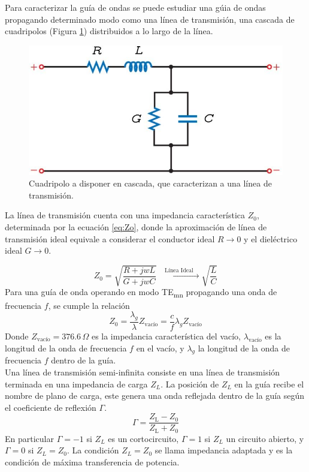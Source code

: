 \documentclass[11pt,a4paper]{article}
\begin{document}
\begin{multicols}{2}
Para caracterizar la guía de ondas se puede estudiar una gúia de ondas propagando determinado modo como una línea de transmisión, una cascada de cuadripolos (Figura \ref{fig:cuadri}) distribuidos a lo largo de la línea.
\begin{figure}[H]
\centering
\includegraphics[width=0.8\linewidth]{Images/linea de transm.jpeg}
\caption{Cuadripolo a disponer en cascada, que caracterizan a una línea de transmisión.}\label{fig:cuadri}
\end{figure}
La línea de transmisión cuenta con una impedancia característica $Z_0$, determinada por la ecuación \ref{eq:Zo}, donde la aproximación de línea de transmisión ideal equivale a considerar el conductor ideal $R\rightarrow 0$ y el dieléctrico ideal $G\rightarrow 0$.

\begin{equation}\label{eq:Zo}
    Z_0=\sqrt{\frac{R+jwL}{G+jwC}}\xrightarrow{\quad\text{Línea Ideal} \quad}\sqrt{\frac{L}{C}}
\end{equation}
Para una guía de onda operando en modo TE\textsubscript{mn} propagando una onda de frecuencia $f$, se cumple la relación
\begin{equation}
    Z_0=\frac{\lambda_g}{\lambda} Z_\text{vacío} = \frac{c}{f}\lambda_g Z_\text{vacío}
\end{equation}
Donde $Z_\text{vacío} = 376.6 \, \Omega$ es la impedancia característica del vacío, $\lambda_\text{vacío}$ 
es la longitud de la onda de frecuencia $f$ en el vacío, y $\lambda_g$ la longitud de la onda de frecuencia $f$ dentro de la guía.\\

Una línea de transmisión semi-infinita consiste en una línea de transmisión terminada en una impedancia de carga $Z_L$. 
La posición de $Z_L$ en la guía recibe el nombre de plano de carga, este genera una onda reflejada dentro de la guía según el coeficiente de reflexión $\Gamma$. 
\begin{equation}\label{eq:gamma}
    \Gamma = \frac{Z_\text{L}-Z_0}{Z_\text{L}+Z_0} 
\end{equation}
En particular $\Gamma = -1$ si $Z_L$ es un cortocircuito, $\Gamma = 1$ si $Z_L$ un circuito abierto, y $\Gamma = 0$ si $Z_L=Z_0$. La condición $Z_L=Z_0$ se llama impedancia adaptada y es la condición de máxima transferencia de potencia.\\ 


\end{multicols}
\end{document}
